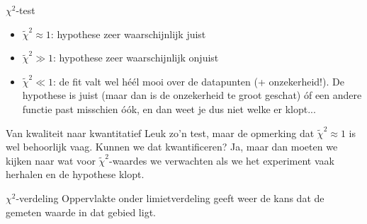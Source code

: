 \documentclass{beamer}
\newcommand{\rchisq}{\tilde\chi^2}
\begin{document}
\begin{frame}{$\chi^2$-test}
  \begin{itemize}
    \item $\rchisq \approx 1$: hypothese zeer waarschijnlijk juist
    \item $\rchisq \gg 1$: hypothese zeer waarschijnlijk onjuist
    \item $\rchisq \ll 1$: de fit valt wel héél mooi over de datapunten (+ onzekerheid!). De hypothese is juist (maar dan is de onzekerheid te groot geschat) óf een andere functie past misschien óók, en dan weet je dus niet welke er klopt...
  \end{itemize}
\end{frame}

\begin{frame}{Van kwaliteit naar kwantitatief}
  Leuk zo'n test, maar de opmerking dat $\rchisq \approx 1$ is wel behoorlijk vaag. Kunnen we dat kwantificeren? Ja, maar dan moeten we kijken naar wat voor $\rchisq$-waardes we verwachten als we het experiment vaak herhalen en de hypothese klopt.
\end{frame}

\begin{frame}[label=wip]{$\chi^2$-verdeling}
  Oppervlakte onder limietverdeling geeft weer de kans dat de gemeten waarde in dat gebied ligt.
\end{frame}
\end{document}
